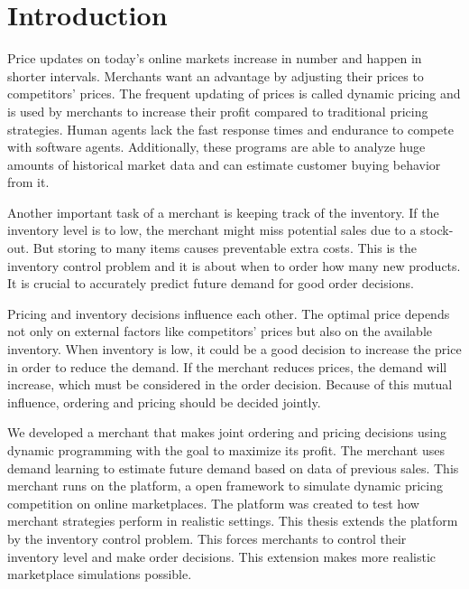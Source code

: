 
\chapter{Introduction}
Price updates on today's online markets increase in number and happen in shorter intervals.
Merchants want an advantage by adjusting their prices to competitors' prices.
The frequent updating of prices is called dynamic pricing and is used by merchants to increase their profit compared to traditional pricing strategies.
Human agents lack the fast response times and endurance to compete with software agents.
Additionally, these programs are able to analyze huge amounts of historical market data and can estimate customer buying behavior from it.

Another important task of a merchant is keeping track of the inventory.
If the inventory level is to low, the merchant might miss potential sales due to a stock-out.
But storing to many items causes preventable extra costs.
This is the inventory control problem and it is about when to order how many new products.
It is crucial to accurately predict future demand for good order decisions.

Pricing and inventory decisions influence each other.
The optimal price depends not only on external factors like competitors' prices but also on the available inventory.
When inventory is low, it could be a good decision to increase the price in order to reduce the demand.
If the merchant reduces prices, the demand will increase, which must be considered in the order decision.
Because of this mutual influence, ordering and pricing should be decided jointly.

We developed a merchant that makes joint ordering and pricing decisions using dynamic programming with the goal to maximize its profit.
The merchant uses demand learning to estimate future demand based on data of previous sales.
This merchant runs on the \pricewars platform, a open framework to simulate dynamic pricing competition on online marketplaces.
The platform was created to test how merchant strategies perform in realistic settings.
This thesis extends the platform by the inventory control problem.
This forces merchants to control their inventory level and make order decisions.
This extension makes more realistic marketplace simulations possible.


